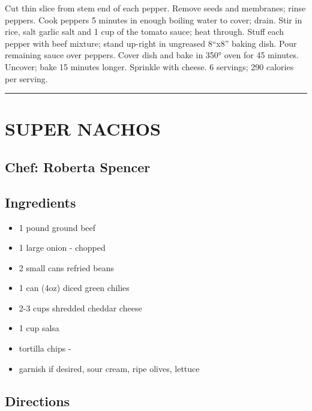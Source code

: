 \documentclass[
]{book}
\providecommand{\tightlist}{%
  \setlength{\itemsep}{0pt}\setlength{\parskip}{0pt}}
\begin{document}
Cut thin slice from stem end of each pepper. Remove seeds and membranes; rinse peppers. Cook peppers
5 minutes in enough boiling water to cover; drain. Stir in rice, salt garlic salt and 1 cup of the tomato sauce;
heat through. Stuff each pepper with beef mixture; stand up-right in ungreased 8``x8'' baking dish.
Pour remaining sauce over peppers. Cover dish and bake in 350° oven for 45 minutes. Uncover; bake 15 minutes longer.
Sprinkle with cheese. 6 servings; 290 calories per serving.

\begin{center}\rule{0.5\linewidth}{0.5pt}\end{center}

\hypertarget{super-nachos}{%
\section*{SUPER NACHOS}\label{super-nachos}}


\hypertarget{chef-roberta-spencer-24}{%
\subsection*{Chef: Roberta Spencer}\label{chef-roberta-spencer-24}}


\hypertarget{ingredients-67}{%
\subsection*{Ingredients}\label{ingredients-67}}


\begin{itemize}
\tightlist
\item
  1 pound ground beef
\item
  1 large onion - chopped
\item
  2 small cans refried beans
\item
  1 can (4oz) diced green chilies
\item
  2-3 cups shredded cheddar cheese
\item
  1 cup salsa
\item
  tortilla chips -
\item
  garnish if desired, sour cream, ripe olives, lettuce
\end{itemize}

\hypertarget{directions-67}{%
\subsection*{Directions}\label{directions-67}}
\end{document}
